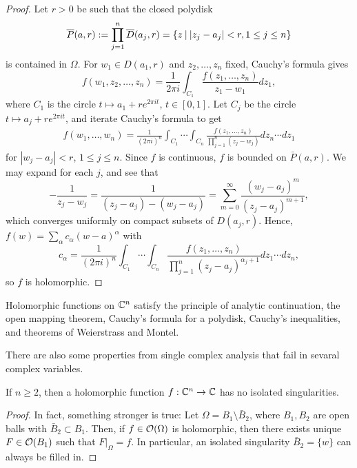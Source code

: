 \documentclass[11pt]{article}
\begin{document}
\begin{proof}
    Let $r>0$ be such that the closed polydisk 
    $$\overline P(a,r):=\prod_{j=1}^n\overline D(a_j,r) = \left \{ z \: \middle |\: |z_j-a_j|<r, 1 \leq j \leq n \right \}$$
    is contained in $\Omega$. For $w_1 \in D(a_1,r)$ and $z_2,\dots,z_n$ fixed, Cauchy's formula gives
    $$f(w_1,z_2,\dots,z_n) = \frac{1}{2\pi i}\int_{C_1}\frac{f(z_1,\dots,z_n)}{z_1-w_1}dz_1,$$
    where $C_1$ is the circle $t \mapsto a_1 +re^{2\pi i t}$, $t \in [0,1]$. Let $C_j$ be the circle $t \mapsto a_j +re^{2\pi it}$, and iterate Cauchy's formula to get
    \begin{align*}
        f(w_1,\dots,w_n) = \frac{1}{(2\pi i )^n}\int_{C_1}\cdots \int_{C_n}\frac{f(z_1,\dots,z_n)}{\prod_{j=1}^n(z_j-w_j)}dz_n \cdots dz_1
    \end{align*}
    for $|w_j-a_j|<r$, $1 \leq j \leq n$. Since $f$ is continuous, $f$ is bounded on $\bar P(a,r)$. We may expand for each $j$, and see that
    $$-\frac{1}{z_j-w_j}=\frac{1}{(z_j-a_j)-(w_j-a_j)}=\sum_{m=0}^\infty \frac{(w_j-a_j)^m}{(z_j-a_j)^{m+1}},$$
    which converges uniformly on compact subsets of $D(a_j,r)$. Hence, $f(w) = \sum_{\alpha}c_\alpha(w-a)^{\alpha}$ with
    $$c_\alpha = \frac{1}{(2\pi i)^n}\int_{C_1}\cdots \int_{C_n}\frac{f(z_1,\dots, z_n)}{\prod_{j=1}^n(z_j-a_j)^{\alpha_j+1}}dz_1\cdots dz_n,$$
    so $f$ is holomorphic.
\end{proof}

\begin{prop}
    Holomorphic functions on $\mathbb{C}^n$ satisfy the principle of analytic continuation, the open mapping theorem, Cauchy's formula for a polydisk, Cauchy's inequalities, and theorems of Weierstrass and Montel.
\end{prop}

There are also some properties from single complex analysis that fail in sevaral complex variables.

\begin{thm}
If $n\geq 2$, then a holomorphic function $f:\mathbb{C}^n\to \mathbb{C}$ has no isolated singularities.
\end{thm}

\begin{proof}
    In fact, something stronger is true: Let $\Omega = B_1 \setminus \bar B_2$, where $B_1,B_2$ are open balls with $\bar B_2 \subset B_1$. Then, if $f \in \mathcal O(\Omega)$ is holomorphic, then there exists unique $F \in \mathcal O(B_1)$ such that $F|_\Omega=f$. In particular, an isolated singularity $\bar B_2=\{w\}$ can always be filled in.
\end{proof}
\end{document}
